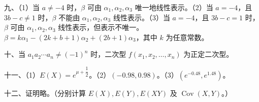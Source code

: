 \documentclass[UTF8,12pt]{ctexart}
\begin{document}
九、（1）当 \(\displaystyle a\ne-4\) 时，\(\displaystyle \beta\) 可由 \(\displaystyle \alpha_1,\allowbreak \alpha_2,\allowbreak \alpha_3\) 唯一地线性表示。（2）当 \(\displaystyle a=-4\)，且 \(\displaystyle 3b-c\ne1\) 时，\(\displaystyle \beta\) 不能由 \(\displaystyle \alpha_1,\allowbreak \alpha_2,\allowbreak \alpha_3\) 线性表示。（3）当 \(\displaystyle a=-4\)，且 \(\displaystyle 3b-c=1\) 时，\(\displaystyle \beta\) 可由 \(\displaystyle \alpha_1,\allowbreak \alpha_2,\allowbreak \alpha_3\) 线性表示，但表示不唯一。\(\displaystyle \beta=k\alpha_1-(2k+b+1)\alpha_2+(2b+1)\alpha_3\)，其中 \(\displaystyle k\) 为任意常数。


十、当 \(\displaystyle a_1a_2\cdots a_n\ne(-1)^n\) 时，二次型 \(\displaystyle f(x_1,\allowbreak x_2,\allowbreak \ldots,\allowbreak x_n)\) 为正定二次型。


十一、（1）\(\displaystyle E(X)=e^{\mu+\dfrac{\displaystyle 1}{\displaystyle 2}}\)。（2）\(\displaystyle (-0.98,\allowbreak 0.98)\)。（3）\(\displaystyle (e^{-0.48},\allowbreak e^{1.48})\)。


十二、证明略。（分别计算 \(\displaystyle E(X),\allowbreak E(Y),\allowbreak E(XY)\) 及 \(\displaystyle \operatorname{Cov}(X,\allowbreak Y)\)。）
\end{document}
